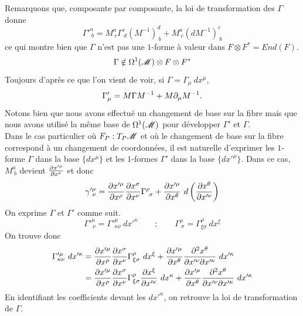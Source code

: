 \documentclass[a4paper,11pt]{report}
\begin{document}
            Remarquons que, composante par composante, la loi de transformation des $\Gamma$ donne 
            \begin{equation}
                \Gamma'^{a}_{~b} = M^a_{~c}\Gamma^c_{~d}(M^{-1})^d_{~b}+M^a_{~c}(dM^{-1})^c_{~b}
            \end{equation}
            ce qui montre bien que $\Gamma$ n'est pas une $1$-forme à valeur dans $F\otimes F^* = End(F)$.
            \begin{equation}
                \Gamma\notin \Omega^1(\mathscr{M})\otimes F \otimes F^*
            \end{equation}
            Toujours d'après ce que l'on vient de voir, si $\Gamma = \Gamma_\mu~dx^\mu$,
            \begin{equation}
                \Gamma'_{\mu} = M\Gamma M^{-1} + M\partial_\mu M^{-1}.
            \end{equation}
            Notons bien que nous avons effectué un changement de base sur la fibre mais que nous avons utilisé la même base de $\Omega^1(\mathscr{M})$ pour développer $\Gamma'$ et $\Gamma$.\\
            
            Dans le cas particulier où $F_P : T_P\mathscr{M}$ et où le changement de base sur la fibre correspond à un changement de coordonnées, il est naturelle d'exprimer les $1$-forme $\Gamma$ dans la base $\{dx^\mu\}$ et les $1$-formes $\Gamma'$ dans la base $\{dx'^\mu\}$. Dans ce cas, $M^a_{~b}$ devient $\pdv{x'^\mu}{x^\nu}$ et donc 
            \begin{equation}
                \gamma'^\mu_{~\nu} = \pdv{x'^\mu}{x^\rho}\pdv{x^\sigma}{x^\nu}\Gamma^\rho_{~\sigma} + \pdv{x'^\mu}{x^\theta}~d\left( \pdv{x^\theta}{x'^\nu} \right)
            \end{equation}
            On exprime $\Gamma$ et $\Gamma'$ comme suit.
            \begin{equation}
                \Gamma'^\mu_{~\nu} =  \Gamma'^\mu_{\kappa\nu}~dx'^\kappa \qquad ; \qquad  \Gamma^\rho_{~\sigma} =  \Gamma^\rho_{\xi\sigma}~dx^\xi
            \end{equation}
            On trouve donc 
            \begin{align}
                \Gamma'^\mu_{\kappa\nu}~dx'^\kappa &= \pdv{x'^\mu}{x^\rho}\pdv{x^\sigma}{x^\nu} \Gamma^\rho_{\xi\sigma}~dx^\xi + \pdv{x'^\mu}{x^\theta}\pdv{x^\theta}{x'^\nu}{x'^\kappa}~dx'^\kappa\\
                &= \pdv{x'^\mu}{x^\rho}\pdv{x^\sigma}{x^\nu} \Gamma^\rho_{\xi\sigma}\pdv{x^\xi}{x'^\kappa}~dx^\kappa + \pdv{x'^\mu}{x^\theta}\pdv{x^\theta}{x'^\nu}{x'^\kappa}~dx'^\kappa
            \end{align}
            En identifiant les coefficients devant les $dx'^\kappa$, on retrouve la loi de transformation de $\Gamma$.
            
\end{document}
